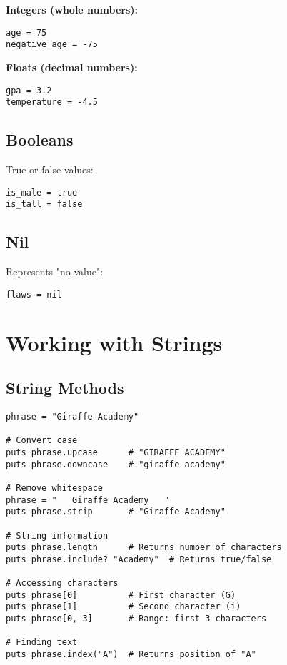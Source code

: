 \documentclass[12pt,a4paper]{article}
\begin{document}
\textbf{Integers (whole numbers):}
\begin{lstlisting}
age = 75
negative_age = -75
\end{lstlisting}

\textbf{Floats (decimal numbers):}
\begin{lstlisting}
gpa = 3.2
temperature = -4.5
\end{lstlisting}

\subsection{Booleans}
True or false values:
\begin{lstlisting}
is_male = true
is_tall = false
\end{lstlisting}

\subsection{Nil}
Represents "no value":
\begin{lstlisting}
flaws = nil
\end{lstlisting}

\section{Working with Strings}

\subsection{String Methods}

\begin{lstlisting}
phrase = "Giraffe Academy"

# Convert case
puts phrase.upcase      # "GIRAFFE ACADEMY"
puts phrase.downcase    # "giraffe academy"

# Remove whitespace
phrase = "   Giraffe Academy   "
puts phrase.strip       # "Giraffe Academy"

# String information
puts phrase.length      # Returns number of characters
puts phrase.include? "Academy"  # Returns true/false

# Accessing characters
puts phrase[0]          # First character (G)
puts phrase[1]          # Second character (i)
puts phrase[0, 3]       # Range: first 3 characters

# Finding text
puts phrase.index("A")  # Returns position of "A"
\end{lstlisting}
\end{document}
